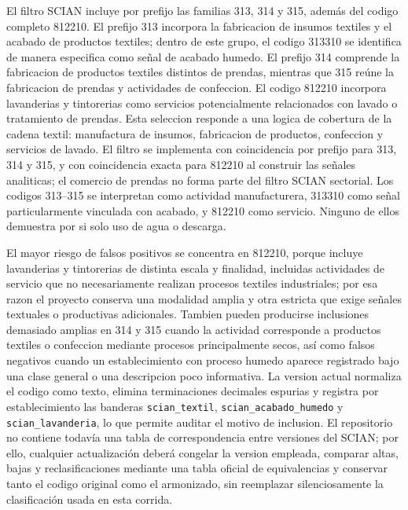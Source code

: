 \documentclass[11pt,letterpaper]{article}
\begin{document}
El filtro SCIAN incluye por prefijo las familias 313, 314 y 315, además del codigo completo 812210. El prefijo 313 incorpora la fabricacion de insumos textiles y el acabado de productos textiles; dentro de este grupo, el codigo 313310 se identifica de manera especifica como señal de acabado humedo. El prefijo 314 comprende la fabricacion de productos textiles distintos de prendas, mientras que 315 reúne la fabricacion de prendas y actividades de confeccion. El codigo 812210 incorpora lavanderias y tintorerias como servicios potencialmente relacionados con lavado o tratamiento de prendas. Esta seleccion responde a una logica de cobertura de la cadena textil: manufactura de insumos, fabricacion de productos, confeccion y servicios de lavado. El filtro se implementa con coincidencia por prefijo para 313, 314 y 315, y con coincidencia exacta para 812210 al construir las señales analiticas; el comercio de prendas no forma parte del filtro SCIAN sectorial. Los codigos 313--315 se interpretan como actividad manufacturera, 313310 como señal particularmente vinculada con acabado, y 812210 como servicio. Ninguno de ellos demuestra por si solo uso de agua o descarga.

El mayor riesgo de falsos positivos se concentra en 812210, porque incluye lavanderias y tintorerias de distinta escala y finalidad, incluidas actividades de servicio que no necesariamente realizan procesos textiles industriales; por esa razon el proyecto conserva una modalidad amplia y otra estricta que exige señales textuales o productivas adicionales. Tambien pueden producirse inclusiones demasiado amplias en 314 y 315 cuando la actividad corresponde a productos textiles o confeccion mediante procesos principalmente secos, así como falsos negativos cuando un establecimiento con proceso humedo aparece registrado bajo una clase general o una descripcion poco informativa. La version actual normaliza el codigo como texto, elimina terminaciones decimales espurias y registra por establecimiento las banderas \texttt{scian\_textil}, \texttt{scian\_acabado\_humedo} y \texttt{scian\_lavanderia}, lo que permite auditar el motivo de inclusion. El repositorio no contiene todavía una tabla de correspondencia entre versiones del SCIAN; por ello, cualquier actualización deberá congelar la version empleada, comparar altas, bajas y reclasificaciones mediante una tabla oficial de equivalencias y conservar tanto el codigo original como el armonizado, sin reemplazar silenciosamente la clasificación usada en esta corrida.
\end{document}
